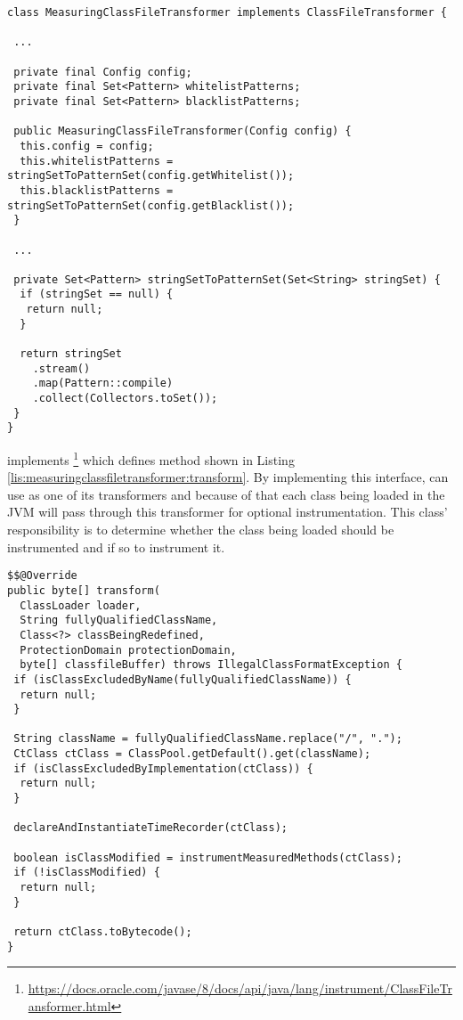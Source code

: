\noindent\begin{minipage}[c]{\linewidth}
\begin{lstlisting}[breaklines,caption={$MeasuringClassFileTransformer$ initialization},label=lis:measuringclassfiletransformer:constructor]
class MeasuringClassFileTransformer implements ClassFileTransformer {

 ...

 private final Config config;
 private final Set<Pattern> whitelistPatterns;
 private final Set<Pattern> blacklistPatterns;

 public MeasuringClassFileTransformer(Config config) {
  this.config = config;
  this.whitelistPatterns = stringSetToPatternSet(config.getWhitelist());
  this.blacklistPatterns = stringSetToPatternSet(config.getBlacklist());
 }

 ...

 private Set<Pattern> stringSetToPatternSet(Set<String> stringSet) {
  if (stringSet == null) {
   return null;
  }

  return stringSet
    .stream()
    .map(Pattern::compile)
    .collect(Collectors.toSet());
 }
}
\end{lstlisting}
\end{minipage}

\noindent {} implements  \footnote{\url{https://docs.oracle.com/javase/8/docs/api/java/lang/instrument/ClassFileTransformer.html}} which defines method  shown in Listing \ref{lis:measuringclassfiletransformer:transform}. By implementing this interface,  can use  as one of its transformers and because of that each class being loaded in the JVM will pass through this transformer for optional instrumentation. This class' responsibility is to determine whether the class being loaded should be instrumented and if so to instrument it.

\noindent\begin{minipage}[c]{\linewidth}
\begin{lstlisting}[breaklines,caption={$MeasuringClassFileTransformer.transform$ implementation},label=lis:measuringclassfiletransformer:transform]
$$@Override
public byte[] transform(
  ClassLoader loader,
  String fullyQualifiedClassName,
  Class<?> classBeingRedefined,
  ProtectionDomain protectionDomain,
  byte[] classfileBuffer) throws IllegalClassFormatException {
 if (isClassExcludedByName(fullyQualifiedClassName)) {
  return null;
 }

 String className = fullyQualifiedClassName.replace("/", ".");
 CtClass ctClass = ClassPool.getDefault().get(className);
 if (isClassExcludedByImplementation(ctClass)) {
  return null;
 }

 declareAndInstantiateTimeRecorder(ctClass);

 boolean isClassModified = instrumentMeasuredMethods(ctClass);
 if (!isClassModified) {
  return null;
 }

 return ctClass.toBytecode();
}
\end{lstlisting}
\end{minipage}


